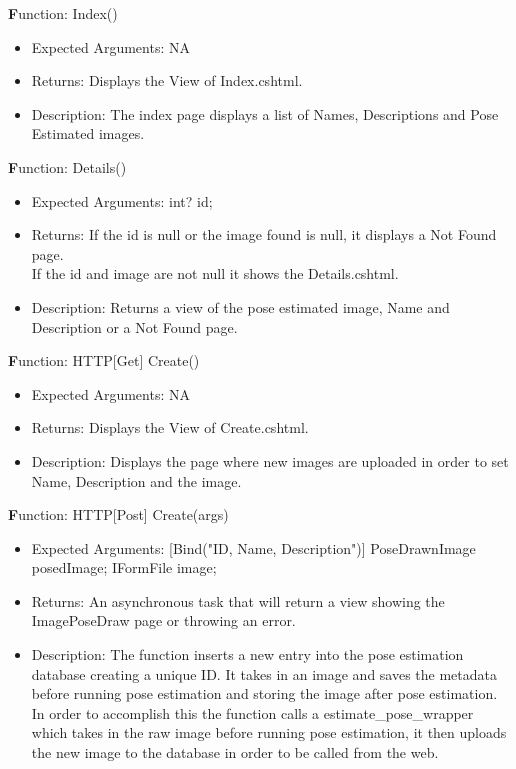 \documentclass{scrreprt}
\begin{document}
  \textbf Function: Index()
  \begin{itemize}
    \item Expected Arguments:
    NA
    \item Returns:
    Displays the View of Index.cshtml.
    \item Description:
    The index page displays a list of Names, Descriptions and Pose Estimated images.
  \end{itemize}

  \textbf Function: Details()
  \begin{itemize}
    \item Expected Arguments:
    int? id;
    \item Returns:
    If the id is null or the image found is null, it displays a Not Found page.
    \\
    If the id and image are not null it shows the Details.cshtml.
    \item Description:
    Returns a view of the pose estimated image, Name and Description or a Not Found page.
  \end{itemize}

  \textbf Function: HTTP[Get] Create()
  \begin{itemize}
    \item Expected Arguments:
    NA
    \item Returns:
    Displays the View of Create.cshtml.
    \item Description:
    Displays the page where new images are uploaded in order to set Name, Description and the image.
  \end{itemize}

  \textbf Function: HTTP[Post] Create(args)
  \begin{itemize}
    \item Expected Arguments:
    [Bind("ID, Name, Description")] PoseDrawnImage posedImage;
    IFormFile image;
    \item Returns:
    An asynchronous task that will return a view showing the ImagePoseDraw page or throwing an error.
    \item Description:
    The function inserts a new entry into the pose estimation database creating a unique ID. It takes in an image and saves the metadata before running pose estimation and storing the image after pose estimation. In order to accomplish this the function calls a estimate\_pose\_wrapper which takes in the raw image before running pose estimation, it then uploads the new image to the database in order to be called from the web.
  \end{itemize}
\end{document}

